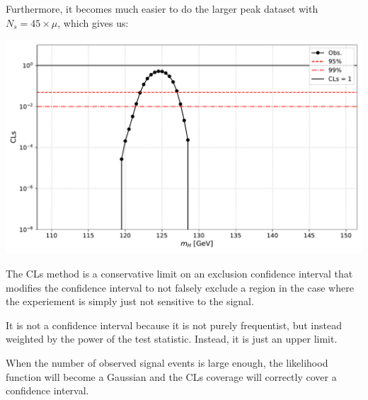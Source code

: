 \documentclass{6042}
\begin{document}
Furthermore, it becomes much easier to do the larger peak dataset with $N_s = 45 \times \mu$, which gives us:

\includegraphics[scale=0.5]{images/clsEnhanced_large_nsig45/cls_plot.pdf}


The CLs method is a conservative limit on an exclusion confidence interval that modifies the confidence interval to not falsely exclude a region in the case where the experiement is simply just not sensitive to the signal. 

It is not a confidence interval because it is not purely frequentist, but instead weighted by the power of the test statistic. Instead, it is just an upper limit. 


When the number of observed signal events is large enough, the likelihood function will become a Gaussian and the CLs coverage will correctly cover a confidence interval. 
\end{document}
